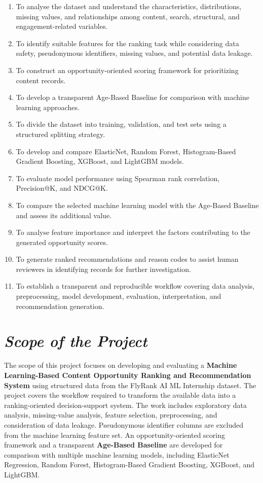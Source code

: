 \documentclass[12pt,a4paper]{report}
\begin{document}
\begin{enumerate}[leftmargin=*]
\item To analyse the dataset and understand the characteristics, distributions, missing values, and relationships among content, search, structural, and engagement-related variables.
\item To identify suitable features for the ranking task while considering data safety, pseudonymous identifiers, missing values, and potential data leakage.
\item To construct an opportunity-oriented scoring framework for prioritizing content records.
\item To develop a transparent Age-Based Baseline for comparison with machine learning approaches.
\item To divide the dataset into training, validation, and test sets using a structured splitting strategy.
\item To develop and compare ElasticNet, Random Forest, Histogram-Based Gradient Boosting, XGBoost, and LightGBM models.
\item To evaluate model performance using Spearman rank correlation, Precision@K, and NDCG@K.
\item To compare the selected machine learning model with the Age-Based Baseline and assess its additional value.
\item To analyse feature importance and interpret the factors contributing to the generated opportunity scores.
\item To generate ranked recommendations and reason codes to assist human reviewers in identifying records for further investigation.
\item To establish a transparent and reproducible workflow covering data analysis, preprocessing, model development, evaluation, interpretation, and recommendation generation.
\end{enumerate}

\section{\textit{Scope of the Project}}
The scope of this project focuses on developing and evaluating a \textbf{Machine Learning-Based Content Opportunity Ranking and Recommendation System} using structured data from the FlyRank AI ML Internship dataset. The project covers the workflow required to transform the available data into a ranking-oriented decision-support system. The work includes exploratory data analysis, missing-value analysis, feature selection, preprocessing, and consideration of data leakage. Pseudonymous identifier columns are excluded from the machine learning feature set. An opportunity-oriented scoring framework and a transparent \textbf{Age-Based Baseline} are developed for comparison with multiple machine learning models, including ElasticNet Regression, Random Forest, Histogram-Based Gradient Boosting, XGBoost, and LightGBM.
\end{document}
